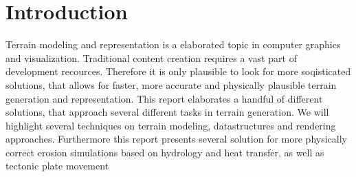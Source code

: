 \section{Introduction}
Terrain modeling and representation is a elaborated topic in computer graphics and visualization. Traditional content creation requires a vast part of development recources. Therefore it is only plausible to look for more soqisticated solutions, that allows for faster, more accurate and physically plausible terrain generation and representation. This report elaborates a handful of different solutions, that approach several different tasks in terrain generation. 
We will highlight several techniques on terrain modeling, datastructures and rendering approaches. 
Furthermore this report presents several solution for more physically correct erosion simulations based on hydrology and heat transfer, as well as tectonic plate movement


